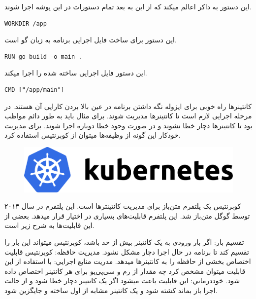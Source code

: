 \documentclass[a4]{report}
\begin{document}
این دستور به داکر اعالم میکند که از این به بعد تمام دستورات در این پوشه اجرا شوند.

\begin{latin}
\begin{verbatim}
WORKDIR /app
\end{verbatim}
\end{latin}

این دستور برای ساخت فایل اجرایی برنامه به زبان گو است.

\begin{latin}
\begin{verbatim}
RUN go build -o main .
\end{verbatim}
\end{latin}

این دستور فایل اجرایی ساخته شده را اجرا میکند.

\begin{latin}
\begin{verbatim}
CMD ["/app/main"]
\end{verbatim}
\end{latin}


کانتینرها راه خوبی برای ایزوله نگه داشتن برنامه در عین بالا بردن کارایی آن هستند. در مرحله اجرایی لازم است تا
کانتینر‌ها مدیریت شوند. برای مثال باید به طور دائم مواظب بود تا کانتینرها دچار خطا نشوند و در صورت وجود
خطا دوباره اجرا شوند. برای مدیریت خودکار این گونه از وظیفه‌ها میتوان از کوبرنتیس استفاده کرد.

\begin{figure}
  \centering
  \includegraphics[scale=0.5]{fig/kubernetes}
\end{figure}

کوبرنتیس یک پلتفرم متن‌باز برای مدیریت کانتینتر‌ها است. این پلتفرم در سال ۲۰۱۴ توسط گوگل متن‌باز
شد. این پلتفرم قابلیت‌های بسیاری در اختیار قرار میدهد. بعضی از این قابلیت‌ها به شرح زیر است.

 تقسیم بار: اگر بار ورودی به یک کانتینر بیش از حد باشد، کوبرنتیس میتواند این بار را تقسیم کند
تا برنامه در حال اجرا دچار مشکل نشود.
 مدیریت حافظه: کوبرنتیس قابلیت اختصاص بخشی از حافظه را به کانتینر‌ها میدهد.
 مدریت منابع اجرایي: با استفاده از این قابلیت میتوان مشخص کرد چه مقدار از رم و سی‌پی‌یو برای هر کانتینر اختصاص داده شود.
 خود‌درماني: این قابلیت باعث میشود اگر یک کانتینر دچار خطا شود و از حالت اجرا باز بماند کشته
شود و یک کانتینر مشابه از اول ساخته و جایگزین شود.
\end{document}
